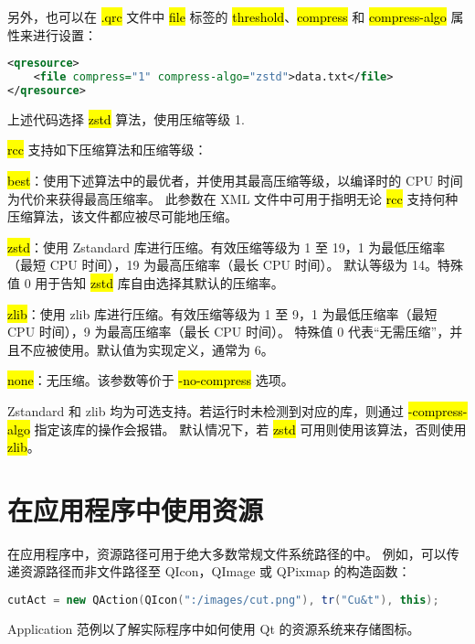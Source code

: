另外，也可以在 \hl{.qrc} 文件中 \hl{file} 标签的 \hl{threshold}、\hl{compress} 和 \hl{compress-algo} 属性来进行设置：

\begin{lstlisting}[language=XML]  
<qresource>
    <file compress="1" compress-algo="zstd">data.txt</file>
</qresource>
\end{lstlisting}

上述代码选择 \hl{zstd} 算法，使用压缩等级 1.

\hl{rcc} 支持如下压缩算法和压缩等级：

\begin{compactitem}[\arr]
\item \hl{best}：使用下述算法中的最优者，并使用其最高压缩等级，以编译时的 CPU 时间为代价来获得最高压缩率。
    此参数在 XML 文件中可用于指明无论 \hl{rcc} 支持何种压缩算法，该文件都应被尽可能地压缩。
\item \hl{zstd}：使用 Zstandard 库进行压缩。有效压缩等级为 1 至 19，1 为最低压缩率（最短 CPU 时间），19 为最高压缩率（最长 CPU 时间）。
 默认等级为 14。特殊值 0 用于告知 \hl{zstd} 库自由选择其默认的压缩率。
\item \hl{zlib}：使用 zlib 库进行压缩。有效压缩等级为 1 至 9，1 为最低压缩率（最短 CPU 时间），9 为最高压缩率（最长 CPU 时间）。
    特殊值 0 代表“无需压缩”，并且不应被使用。默认值为实现定义，通常为 6。
\item \hl{none}：无压缩。该参数等价于 \hl{-no-compress} 选项。
\end{compactitem}

Zstandard 和 zlib 均为可选支持。若运行时未检测到对应的库，则通过 \hl{-compress-algo} 指定该库的操作会报错。
默认情况下，若 \hl{zstd} 可用则使用该算法，否则使用 \hl{zlib}。

\section{在应用程序中使用资源}

在应用程序中，资源路径可用于绝大多数常规文件系统路径的中。
例如，可以传递资源路径而非文件路径至 QIcon，QImage 或 QPixmap 的构造函数：

\begin{lstlisting}[language=C++]
cutAct = new QAction(QIcon(":/images/cut.png"), tr("Cu&t"), this);
\end{lstlisting}

\begin{notice}
Application 范例以了解实际程序中如何使用 Qt 的资源系统来存储图标。
\end{notice}

